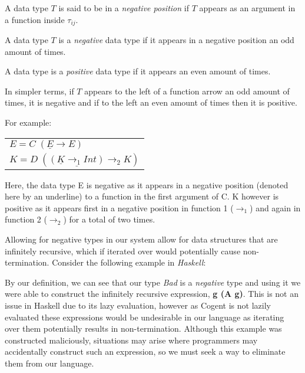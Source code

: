 \theoremstyle{definition}
\begin{definition}
    A data type $T$ is said to be in a \textit{negative position} if $T$ appears as an argument in a function
    inside $\tau_{ij}$.
\end{definition}

\theoremstyle{definition}
\begin{definition}
    A data type $T$ is a \textit{negative} data type if it appears in a negative position an odd amount
    of times.
\end{definition}

\theoremstyle{definition}
\begin{definition}
    A data type is a \textit{positive} data type if it appears an even amount of times.
\end{definition}

In simpler terms, if $T$ appears to the left of a function arrow an odd amount of times, it is negative and if
to the left an even amount of times then it is positive.

For example:

\begin{center}
    \begin{tabular}{l}
        $E = C\; (\underline{E} \rightarrow E)$ \\
        $K = D\; (\underline{(\underline{K} \rightarrow_1 Int)} \rightarrow_2 K)$
    \end{tabular} 
\end{center}

Here, the data type E is negative as it appears in a negative position (denoted here by an underline)
to a function in the first argument of C.
K however is positive as it appears first in a negative position in function 1 ($\rightarrow_1$) and again
in function 2 ($\rightarrow_2$) for a total of two times.

Allowing for negative types in our system allow for data structures that are infinitely recursive,
which if iterated over would potentially cause non-termination. Consider
the following example in \textit{Haskell}:



By our definition, we can see that our type \textit{Bad} is a \textit{negative} type and using it we were able
to construct the infinitely recursive expression, \textbf{g (A g)}.
This is not an issue in Haskell due to its lazy evaluation,
however as Cogent is not lazily evaluated these expressions would be undesirable in
our language as iterating over them potentially results in non-termination.
Although this example was constructed maliciously, situations may arise where
programmers may accidentally construct such an expression, so we must seek a way to
eliminate them from our language.


